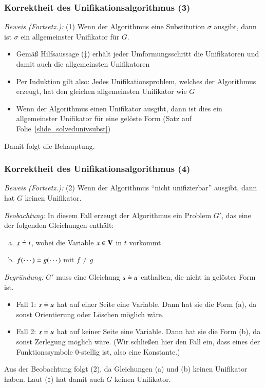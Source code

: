 \documentclass[aspectratio=1610,onlymath]{beamer}
\begin{document}
\begin{frame}[t]\frametitle{Korrektheit des Unifikationsalgorithmus (3)}


\emph{Beweis (Fortsetz.):} (1) Wenn der Algorithmus eine Substitution $\sigma$ ausgibt, dann ist $\sigma$ ein allgemeinster Unifikator für $G$.
\smallskip\pause

\begin{itemize}
\item Gemäß Hilfsaussage ($\ddagger$) erhält jeder Umformungsschritt die Unifikatoren und damit auch die allgemeinsten Unifikatoren\pause
\item Per Induktion gilt also: Jedes Unifikationsproblem, welches der Algorithmus erzeugt, hat den gleichen allgemeinsten Unifikator wie $G$\pause
\item Wenn der Algorithmus einen Unifikator ausgibt, dann ist dies ein allgemeinster Unifikator für eine gelöste Form (Satz auf Folie~\ref{slide_solvedunivsubst})
\end{itemize}
Damit folgt die Behauptung.

\end{frame}

\begin{frame}[t]\frametitle{Korrektheit des Unifikationsalgorithmus (4)}


\emph{Beweis (Fortsetz.):} (2) Wenn der Algorithmus "`nicht unifizierbar"' ausgibt, dann hat $G$ keinen Unifikator.
\smallskip\pause

\emph{Beobachtung:} In diesem Fall erzeugt der Algorithmus ein Problem $G'$, das eine der folgenden Gleichungen enthält:
\begin{enumerate}[(a)]
\item $x\stackrel{.}{=} t$, wobei die Variable $x\in\textbf{\textcolor{black}{V}}$ in $t$ vorkommt
\item $f(\cdots)\stackrel{.}{=} g(\cdots)$ mit $f\neq g$
\end{enumerate}
\pause\emph{Begründung:} $G'$ muss eine Gleichung $s\stackrel{.}{=} u$ enthalten, die nicht in gelöster Form ist.
\begin{itemize}
\item Fall 1: $s\stackrel{.}{=} u$ hat auf einer Seite eine Variable. Dann hat sie die Form (a), da sonst Orientierung oder Löschen möglich wäre.
\item Fall 2: $s\stackrel{.}{=} u$ hat auf keiner Seite eine Variable. Dann hat sie die Form (b), da sonst Zerlegung möglich wäre. (Wir schließen hier den Fall ein, dass eines der Funktionssymbole 0-stellig ist, also eine Konstante.)
\end{itemize}
\pause Aus der Beobachtung folgt (2), da Gleichungen (a) und (b) keinen Unifikator haben.
Laut ($\ddagger$) hat damit auch $G$ keinen Unifikator.


\end{frame}
\end{document}
